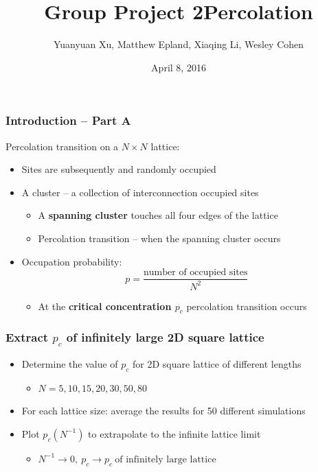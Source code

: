 \documentclass[mathserif,18pt,xcolor=table]{beamer}
\title[Group Project 2]{Group Project 2\newline Percolation}
\author[Xu, Epland, Li, Cohen]{{\small Yuanyuan Xu, Matthew Epland, Xiaqing Li, Wesley Cohen}}
\institute{Duke University}
\date{April 8, 2016}
\begin{document}
\beamertemplateballitem
\frame{\titlepage}




\begin{frame}
	\frametitle{Introduction -- Part A}
	Percolation transition on a $N\times N$ lattice:
	\begin{itemize}
		\item Sites are subsequently and randomly occupied
		\item A cluster -- a collection of interconnection occupied sites
		\begin{itemize}
			\item A \textbf{spanning cluster} touches all four edges of the lattice
			\item Percolation transition -- when the spanning cluster occurs
		\end{itemize}
		\item Occupation probability: 
			\begin{equation}
			p=\frac{\text{number of occupied sites}}{N^2}
			\end{equation}
		\begin{itemize}
			\item At the \textbf{critical concentration $p_c$} percolation transition occurs
		\end{itemize}
	\end{itemize}
\end{frame}



\begin{frame}
	\frametitle{Extract $p_c$ of infinitely large 2D square lattice}
	\begin{itemize}
		\item Determine the value of $p_c$ for 2D square lattice of different lengths \\
		 \begin{itemize}
			\item $N= 5, 10, 15, 20, 30, 50, 80$		
		\end{itemize}
		 \bigskip
		 \item For each lattice size: average the results for 50 different simulations
		 \bigskip
		 \item Plot $p_c(N^{-1})$ to extrapolate to the infinite lattice limit
		 \begin{itemize}
		 	\smallskip
			\item $N^{-1}\rightarrow 0,\  p_c \rightarrow p_c \  \text{of infinitely large lattice}$	
		\end{itemize}
	\end{itemize}
\end{frame}
\end{document}
